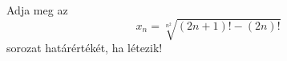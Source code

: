 \documentclass[11pt]{scrartcl}
\begin{document}
Adja meg az
\[
	x_n = \sqrt[n^2]{(2n + 1)! - (2n)!}
\]
sorozat határértékét, ha létezik!
\end{document}
